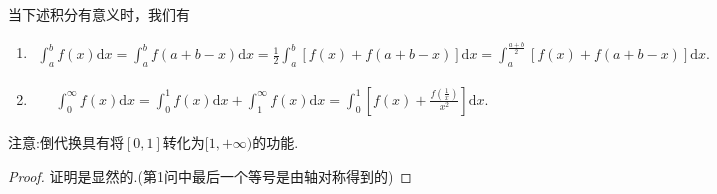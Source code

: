 \documentclass[../../main.tex]{subfiles}
\begin{document}
\begin{theorem}[区间再现恒等式]\label{theorem:区间再现恒等式}
当下述积分有意义时，我们有
\begin{enumerate}
\item \begin{align*}
\int_{a}^{b} f(x)\mathrm{d}x = \int_{a}^{b} f(a + b - x)\mathrm{d}x
=\frac{1}{2}\int_{a}^{b} [f(x)+f(a + b - x)]\mathrm{d}x
=\int_{a}^{\frac{a + b}{2}} [f(x)+f(a + b - x)]\mathrm{d}x.
\end{align*}

\item \begin{align*}
\int_{0}^{\infty} f(x)\mathrm{d}x = \int_{0}^{1} f(x)\mathrm{d}x+\int_{1}^{\infty} f(x)\mathrm{d}x
=\int_{0}^{1} \left[f(x)+\frac{f(\frac{1}{x})}{x^2}\right]\mathrm{d}x.
\end{align*}
\end{enumerate}
\end{theorem}
\begin{note}
注意:倒代换具有将$[0,1]$转化为$[1,+\infty)$的功能.
\end{note}
\begin{proof}
证明是显然的.(第1问中最后一个等号是由轴对称得到的)

\end{proof}
\end{document}

